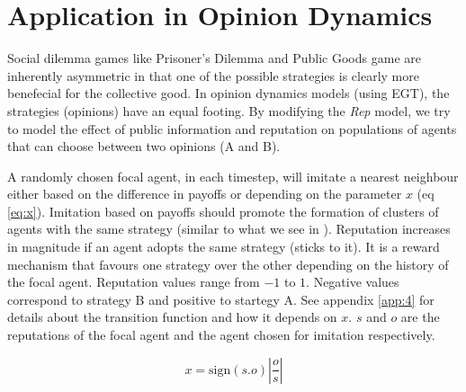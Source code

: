 \documentclass[11pt, A4 paper, twocolumn ]{article}
\begin{document}
	\section{Application in Opinion Dynamics} \label{sec:opdyn}
	Social dilemma games like Prisoner's Dilemma and Public Goods game are inherently asymmetric in that one of the possible strategies is clearly more benefecial for the collective good. In opinion dynamics models (using EGT), the strategies (opinions) have an equal footing. By modifying the \textit{Rep} model, we try to model the effect of public information and reputation on populations of agents that can choose between two opinions (A and B). \par 
	A randomly chosen focal agent, in each timestep, will imitate a nearest neighbour either based on the difference in payoffs or depending on the parameter $ x $ (eq \ref{eq:x}). Imitation based on payoffs should promote the formation of clusters of agents with the same strategy (similar to what we see in \cite{gametheoryandphysics}). Reputation increases in magnitude if an agent adopts the same strategy (sticks to it). It is a reward mechanism that favours one strategy over the other depending on the history of the focal agent. Reputation values range from $ -1 $ to $ 1 $. Negative values correspond to strategy B and positive to startegy A. See appendix \ref{app:4} for details about the transition function and how it depends on $ x $. $ s $ and $ o $ are the reputations of the focal agent and the agent chosen for imitation respectively.  \par 
	
	\begin{equation}\label{eq:x}
		x = \text{sign}(s.o)\left| \frac{o}{s} \right|
	\end{equation}	
\end{document}
